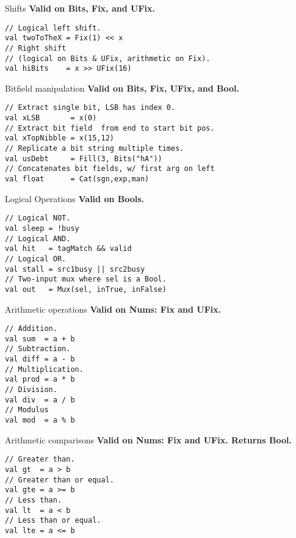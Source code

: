 \documentclass[xcolor=pdflatex,dvipsnames,table]{beamer}
\begin{document}
\begin{frame}[fragile]{Shifts}
\textbf{Valid on Bits, Fix, and UFix.}
\begin{lstlisting}
// Logical left shift.
val twoToTheX = Fix(1) << x   
// Right shift 
// (logical on Bits & UFix, arithmetic on Fix).
val hiBits    = x >> UFix(16) 
\end{lstlisting}
\end{frame}

\begin{frame}[fragile]{Bitfield manipulation}
\textbf{Valid on Bits, Fix, UFix, and Bool.}
\begin{lstlisting}
// Extract single bit, LSB has index 0.
val xLSB       = x(0)                
// Extract bit field  from end to start bit pos. 
val xTopNibble = x(15,12)            
// Replicate a bit string multiple times.
val usDebt     = Fill(3, Bits("hA")) 
// Concatenates bit fields, w/ first arg on left
val float      = Cat(sgn,exp,man)    
\end{lstlisting}
\end{frame}

\begin{frame}[fragile]{Logical Operations}
\textbf{Valid on Bools. }
\begin{lstlisting}
// Logical NOT. 
val sleep = !busy                     
// Logical AND.
val hit   = tagMatch && valid         
// Logical OR.
val stall = src1busy || src2busy      
// Two-input mux where sel is a Bool.  
val out   = Mux(sel, inTrue, inFalse) 
\end{lstlisting}
\end{frame}

\begin{frame}[fragile]{Arithmetic operations}
\textbf{Valid on Nums: Fix and UFix. }
\begin{lstlisting}
// Addition. 
val sum  = a + b  
// Subtraction.
val diff = a - b  
// Multiplication. 
val prod = a * b  
// Division.
val div  = a / b  
// Modulus
val mod  = a % b  
\end{lstlisting}
\end{frame}

\begin{frame}[fragile]{Arithmetic comparisons}
\textbf{Valid on Nums: Fix and UFix. Returns Bool.}
\begin{lstlisting}
// Greater than.
val gt  = a > b   
// Greater than or equal.
val gte = a >= b  
// Less than.
val lt  = a < b   
// Less than or equal.
val lte = a <= b  
\end{lstlisting}
\end{frame}
\end{document}
